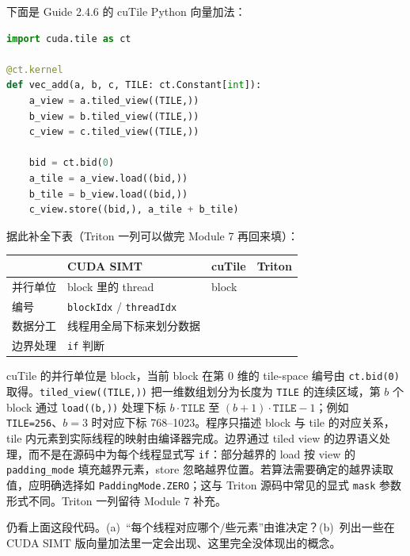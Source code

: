 \documentclass[11pt,a4paper,fontset=none]{ctexart}
\begin{document}
下面是 Guide 2.4.6 的 cuTile Python 向量加法：

\begin{lstlisting}[language=Python]
import cuda.tile as ct

@ct.kernel
def vec_add(a, b, c, TILE: ct.Constant[int]):
    a_view = a.tiled_view((TILE,))
    b_view = b.tiled_view((TILE,))
    c_view = c.tiled_view((TILE,))

    bid = ct.bid(0)
    a_tile = a_view.load((bid,))
    b_tile = b_view.load((bid,))
    c_view.store((bid,), a_tile + b_tile)
\end{lstlisting}

据此补全下表（Triton 一列可以做完 Module 7 再回来填）：

\begin{center}\small
\begin{tabular}{@{}lp{8em}p{9em}p{9em}@{}}
\toprule
 & CUDA SIMT & cuTile & Triton \\
\midrule
并行单位 & block 里的 thread & block & \\
编号 & \texttt{blockIdx} / \texttt{threadIdx} &  & \\
数据分工 & 线程用全局下标来划分数据 &  & \\
边界处理 & \texttt{if} 判断 &  & \\
\bottomrule
\end{tabular}
\end{center}

\begin{tcolorbox}[title={6.2 cuTile 部分作答（讨论后整理）}]
cuTile 的并行单位是 block，当前 block 在第 0 维的 tile-space 编号由 \texttt{ct.bid(0)} 取得。\texttt{tiled\_view((TILE,))} 把一维数组划分为长度为 \texttt{TILE} 的连续区域，第 $b$ 个 block 通过 \texttt{load((b,))} 处理下标 $b\cdot\texttt{TILE}$ 至 $(b+1)\cdot\texttt{TILE}-1$；例如 \texttt{TILE=256}、$b=3$ 时对应下标 768--1023。程序只描述 block 与 tile 的对应关系，tile 内元素到实际线程的映射由编译器完成。边界通过 tiled view 的边界语义处理，而不是在源码中为每个线程显式写 \texttt{if}：部分越界的 load 按 view 的 \texttt{padding\_mode} 填充越界元素，store 忽略越界位置。若算法需要确定的越界读取值，应明确选择如 \texttt{PaddingMode.ZERO}；这与 Triton 源码中常见的显式 \texttt{mask} 参数形式不同。Triton 一列留待 Module 7 补充。
\end{tcolorbox}

仍看上面这段代码。(a)~“每个线程对应哪个/些元素”由谁决定？(b)~列出一些在 CUDA SIMT 版向量加法里一定会出现、这里完全没体现出的概念。
\end{document}

